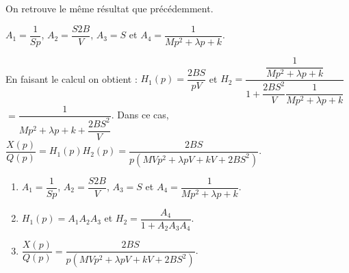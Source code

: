 \begin{corrigebox}
\begin{center}
\end{center}\par\medskip
\normalsize

On retrouve le même résultat que précédemment. 

$A_1=\dfrac{1}{Sp}$,  $A_2 = \dfrac{S2B}{V} $,  $A_3 = S$  et $A_4 = \dfrac{1}{Mp^2  +\lambda p  + k}$.

En faisant le calcul on obtient : 
$H_1(p)=\dfrac{2BS}{pV}  $ et $H_2 = \dfrac{\dfrac{1}{Mp^2  +\lambda p  + k}}{1+ \dfrac{2BS^2}{V}\dfrac{1}{Mp^2  +\lambda p  + k} }$  $= \dfrac{1}{Mp^2  +\lambda p  + k+ \dfrac{2BS^2}{V} }$.
Dans ce cas, $\dfrac{X(p)}{Q(p)}=H_1(p)H_2(p)=\dfrac{2BS}{p\left(MVp^2  +\lambda pV  + kV+ 2BS^2\right) }$.

\begin{enumerate}
\item $A_1=\dfrac{1}{Sp}$,  $A_2 = \dfrac{S2B}{V} $,  $A_3 = S$  et $A_4 = \dfrac{1}{Mp^2  +\lambda p  + k}$.
\item $H_1(p)=A_1  A_2A_3$ et $H_2 = \dfrac{A_4}{1+ A_2A_3A_4 }$.
\item $\dfrac{X(p)}{Q(p)}=\dfrac{2BS}{p\left(MVp^2  +\lambda pV  + kV+ 2BS^2\right) }$.
\end{enumerate}
\end{corrigebox}
